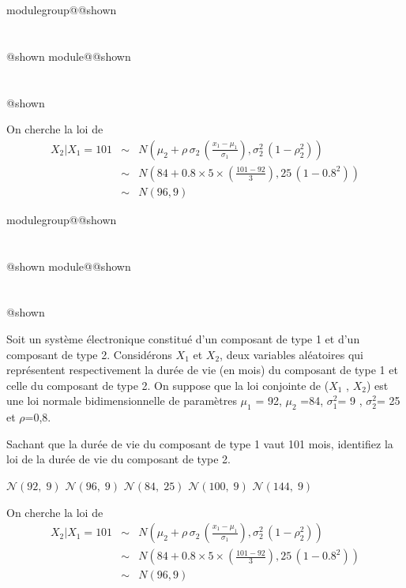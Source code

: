 \documentclass{Evaluation}
\makeatletter
\newcommand{\currentmodulekey}{}
\newcommand{\currentmoduletitle}{}
\newcommand{\currentgroupkey}{}
\newcommand{\currentgrouptitle}{}
\newcommand{\showmoduleifneeded}{%
  \ifx\currentgroupkey\empty\else
    \expandafter\ifx\csname modulegroup@\currentgroupkey @shown\endcsname\relax
      \section*{\currentgrouptitle}%
      \expandafter\gdef\csname modulegroup@\currentgroupkey @shown\endcsname{1}%
    \fi
  \fi
  \expandafter\ifx\csname module@\currentmodulekey @shown\endcsname\relax
    \section*{\currentmoduletitle}%
    \expandafter\gdef\csname module@\currentmodulekey @shown\endcsname{1}%
  \fi
}
\newenvironment{A22}{\showmoduleifneeded}{}
\newenvironment{H23}{\showmoduleifneeded}{}
\makeatother
\begin{document}
\begin{questions}
\begin{A22}
\begin{solution}
On cherche la loi de
		\begin{eqnarray*}
			{X}_2|{X}_1=101 &\sim& N\left(\mu_2 +\rho\, \sigma_2\, \left(\frac{x_1-\mu_1}{\sigma_1}\right),\sigma_2^2 \,\left(1-\rho_2^2\right)\right)\\
			&\sim& N\left(84 +0.8\times 5\times \left(\frac{101-92}{3}\right),25 \,\left(1-0.8^2\right)\right)\\
			&\sim& N\left(96, 9 \right)
	\end{eqnarray*}
\end{solution}

\end{A22}

\begin{H23}
\question {} %
Soit un système électronique constitué d'un composant de type 1 et d'un composant de type 2. Considérons ${X}_1 $ et ${X}_2 $, deux variables aléatoires qui représentent respectivement la durée de vie (en mois) du composant de type 1 et celle du composant de type 2. On suppose que la loi conjointe de (${X}_1 $ , ${X}_2 $) est une loi normale bidimensionnelle de paramètres ${\mu}_1 $ = 92, ${\mu}_2 $ =84, ${\sigma}_1 ^2$= 9 , ${\sigma}_2 ^2$=  25 et $\rho $=0,8.

Sachant que la durée de vie du composant de type 1 vaut 101 mois, identifiez la loi de la durée de vie du composant de type 2.

 \begin{oneparcheckboxes}
		\choice $\mathcal{N}(92, \; 9)$  %
		\correctchoice $\mathcal{N}(96,\;9)$ %
		\choice $\mathcal{N}(84,\; 25)$ %
		\choice $\mathcal{N}(100, \; 9)$ %
		\choice $\mathcal{N}(144, \; 9)$ %
\end{oneparcheckboxes}

\begin{solution}
On cherche la loi de
		\begin{eqnarray*}
			{X}_2|{X}_1=101 &\sim& N\left(\mu_2 +\rho\, \sigma_2\, \left(\frac{x_1-\mu_1}{\sigma_1}\right),\sigma_2^2 \,\left(1-\rho_2^2\right)\right)\\
			&\sim& N\left(84 +0.8\times 5\times \left(\frac{101-92}{3}\right),25 \,\left(1-0.8^2\right)\right)\\
			&\sim& N\left(96, 9 \right)
	\end{eqnarray*}
\end{solution}
\end{H23}


\end{questions}
\end{document}
